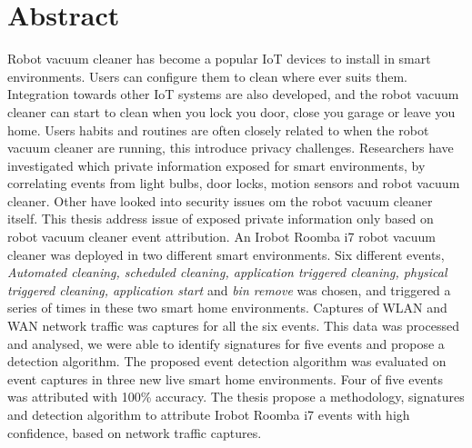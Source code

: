 \chapter*{Abstract}
Robot vacuum cleaner has become a popular IoT devices to install in smart environments. Users can configure them to clean where ever suits them. Integration towards other IoT systems are also developed, and the robot vacuum cleaner can start to clean when you lock you door, close you garage or leave you home. Users habits and routines are often closely related to when the robot vacuum cleaner are running, this introduce privacy challenges. Researchers have investigated which private information exposed for smart environments, by correlating events from light bulbs, door locks, motion sensors and robot vacuum cleaner. Other have looked into security issues om the robot vacuum cleaner itself. This thesis address issue of exposed private information only based on robot vacuum cleaner event attribution. An Irobot Roomba i7 robot vacuum cleaner was deployed in two different smart environments. Six different events, \textit{Automated cleaning, scheduled cleaning, application triggered cleaning, physical triggered cleaning, application start} and \textit{bin remove} was chosen, and triggered a series of times in these two smart home environments. Captures of WLAN and WAN network traffic was captures for all the six events. This data was processed and analysed, we were able to identify signatures for five events and propose a detection algorithm. The proposed event detection algorithm was evaluated on event captures in three new live smart home environments. Four of five events was attributed with 100\% accuracy. The thesis propose a methodology, signatures and detection algorithm to attribute Irobot Roomba i7 events with high confidence, based on network traffic captures.  
